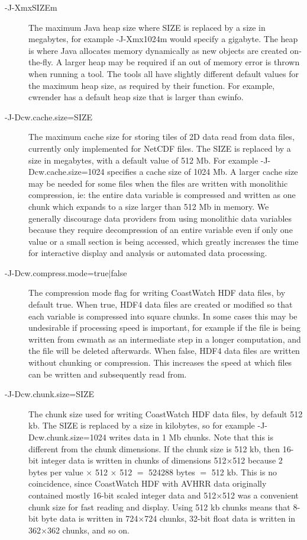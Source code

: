 \begin{description}

  \item[{\file -J-XmxSIZEm}] The maximum Java heap size where SIZE is replaced
  by a size in megabytes, for example {\file -J-Xmx1024m} would specify a
  gigabyte.  The heap is where Java allocates memory dynamically as new objects
  are created on-the-fly.  A larger heap may be required if an out of memory
  error is thrown when running a tool.  The tools all have slightly different
  default values for the maximum heap size, as required by their function.
  For example, cwrender has a default heap size that is larger than cwinfo.

  \item[{\file -J-Dcw.cache.size=SIZE}] The maximum cache size for storing
  tiles of 2D data read from data files, currently only implemented for NetCDF
  files.  The SIZE is replaced by a size in megabytes, with a default value
  of 512 Mb.  For example {\file -J-Dcw.cache.size=1024} specifies a cache
  size of 1024 Mb.  A larger cache size may be needed for some files when the
  files are written with monolithic compression, ie: the entire data variable
  is compressed and written as one chunk which expands to a size larger than
  512 Mb in memory.  We generally discourage data providers from using monolithic data
  variables because they require decompression of an entire variable even if
  only one value or a small section is being accessed, which greatly increases
  the time for interactive display and analysis or automated data processing.

  \item[{\file -J-Dcw.compress.mode=true$|$false}] The compression mode flag for
  writing CoastWatch HDF data files, by default true.  When true, HDF4 data
  files are created or modified so that each variable is compressed into
  square chunks.  In some cases this may be undesirable if processing speed
  is important, for example if the file is being written from cwmath
  as an intermediate step in a longer computation, and the file will be
  deleted afterwards.  When false, HDF4 data files are written without
  chunking or compression.  This increases the speed at which files can be
  written and subsequently read from.

  \item[{\file -J-Dcw.chunk.size=SIZE}] The chunk size used for writing
  CoastWatch HDF data files, by default 512 kb.  The SIZE is replaced by
  a size in kilobytes, so for example {\file -J-Dcw.chunk.size=1024} writes
  data in 1 Mb chunks.  Note that this is different from the chunk dimensions.
  If the chunk size is 512 kb, then 16-bit integer data is written in
  chunks of dimensions 512$\times$512 because 2 bytes per value $\times$ 512
  $\times$ 512 $=$ 524288 bytes $=$ 512 kb.  This is no coincidence, since
  CoastWatch HDF with AVHRR data originally contained mostly 16-bit scaled
  integer data and 512$\times$512 was a convenient chunk size for fast
  reading and display.  Using 512 kb chunks means that 8-bit byte data is written
  in 724$\times$724 chunks, 32-bit float data is written in 362$\times$362
  chunks, and so on.

\end{description}
